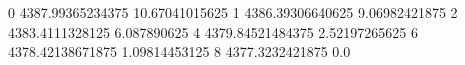 0 4387.99365234375 10.67041015625
1 4386.39306640625 9.06982421875
2 4383.4111328125 6.087890625
4 4379.84521484375 2.52197265625
6 4378.42138671875 1.09814453125
8 4377.3232421875 0.0
